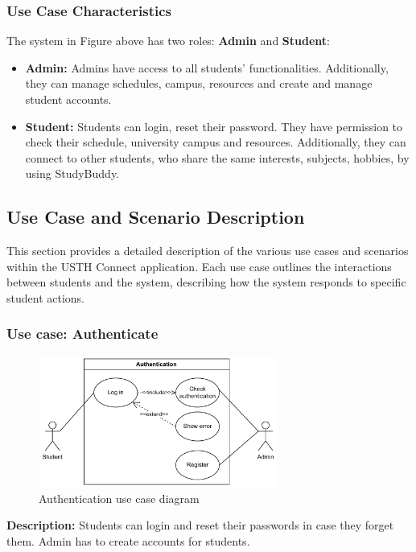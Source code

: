 \documentclass{article}
\begin{document}
\subsubsection{Use Case Characteristics}
    The system in Figure above has two roles: \textbf{Admin} and \textbf{Student}:
    \begin{itemize}
        \item \textbf{Admin:} Admins have access to all students' functionalities. 
        Additionally, they can manage schedules, campus, resources and create and manage student accounts.
        \item \textbf{Student:}  Students can login, reset their password. They have permission to check their schedule, university campus and resources. Additionally, they can connect to other students, who share the same interests, subjects, hobbies,  by using StudyBuddy.
    \end{itemize}

\subsection{Use Case and Scenario Description}
    This section provides a detailed description of the various use cases and scenarios within the USTH Connect application. 
    Each use case outlines the interactions between students and the system, describing how the system responds to specific student actions.
\subsubsection{Use case: Authenticate}
    \begin{figure}[H]
        \centering
        \includegraphics[width=0.7\textwidth]{image/AuthenticationUseCase.pdf} 
        \caption{Authentication use case diagram}
        \label{fig:authenticate_use_case}
    \end{figure}
    \textbf{Description:} Students can login and reset their passwords in case they forget them. Admin has to create accounts for students. \\
\end{document}
